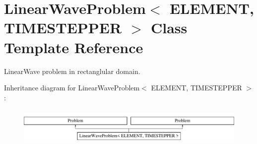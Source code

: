 \hypertarget{classLinearWaveProblem}{}\section{Linear\+Wave\+Problem$<$ E\+L\+E\+M\+E\+NT, T\+I\+M\+E\+S\+T\+E\+P\+P\+ER $>$ Class Template Reference}
\label{classLinearWaveProblem}


Linear\+Wave problem in rectanglular domain.  


Inheritance diagram for Linear\+Wave\+Problem$<$ E\+L\+E\+M\+E\+NT, T\+I\+M\+E\+S\+T\+E\+P\+P\+ER $>$\+:\begin{figure}[H]
\begin{center}
\leavevmode
\includegraphics[height=1.812298cm]{classLinearWaveProblem}
\end{center}
\end{figure}
